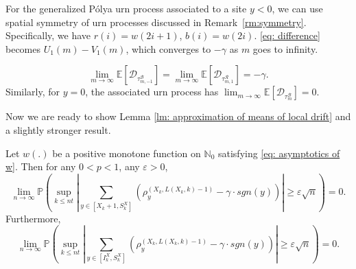 \documentclass[EJP]{ejpecp} %
\newcommand{\abs}[1]{\left\vert #1 \right\vert}
\begin{document}
For the generalized P\'{o}lya urn process associated to a site $y<0$, we can use spatial symmetry of urn processes discussed in Remark~\ref{rm:symmetry}. Specifically, we have $r(i) = w(2i+1)$, $b(i) =w(2i)$. \eqref{eq: difference} becomes $U_1(m)-V_1(m)$, which converges to $-\gamma$ as $m$ goes to infinity.

\begin{equation}\label{eq: general expected drift}
	\lim_{m\to\infty}\mathbb{E}\left[ \mathscr{D}_{\tau^{\mathscr{B}}_{m,-1}} \right] = \lim_{m\to\infty}\mathbb{E}\left[ \mathscr{D}_{\tau^{\mathscr{R}}_{m,1}} \right] = -\gamma.
\end{equation}
Similarly, for $y=0$, the associated urn process has 
$\lim_{m\to\infty}\mathbb{E}\left[ \mathscr{D}_{\tau^{\mathscr{B}}_m} \right] = 0.$

%		
Now we are ready to show Lemma \ref{lm: approximation of means of local drift}
and a slightly stronger result.
\begin{lemma}
	Let $w(.)$ be a positive monotone function on $\mathbb{N}_0$ satisfying \eqref{eq: asymptotics of w}. Then for any $0<p<1$, any $\varepsilon>0$,
	\[
	\lim_{n\to\infty} \mathbb{P}\left( \sup_{k\leq n t}  \abs{  	\sum_{y\in \left[X_{k}+1 ,S_{k}^X\right]} \left( \rho^{(X_k,L(X_k,k)-1)}_y -  \gamma \cdot sgn(y) \right) } \geq  \varepsilon \sqrt{n}     \right) =0.
	\]
	Furthermore,
	\[
	\lim_{n\to\infty} \mathbb{P}\left( \sup_{k\leq n t}  \abs{  	\sum_{y\in \left[I_k^{X} ,S_{k}^X\right]} \left( \rho^{(X_k,L(X_k,k)-1)}_y -  \gamma \cdot sgn(y) \right) } \geq  \varepsilon \sqrt{n}     \right) =0.
	\]
\end{lemma}
\end{document}
